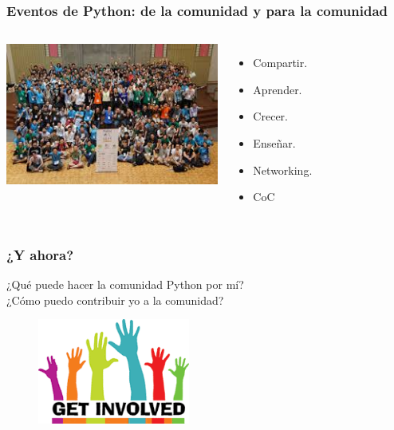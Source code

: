 \documentclass[18pt]{beamer}
\begin{document}
\begin{frame}

	\frametitle{Eventos de Python: de la comunidad y para la comunidad}
	\begin{columns}
		\centering
			\includegraphics[width=7cm]{images/ejemplo_pycon.jpeg}\\
			
		\begin{itemize}
			\setlength\itemsep{0.6em}		
			\item Compartir.
			\item Aprender.
			\item Crecer.
			\item Enseñar.
			\item Networking.
			\item CoC

		\end{itemize}
	\end{columns}
	
	
\end{frame}


\begin{frame}

	\frametitle{¿Y ahora?}
	
	\begin{center}
		\Large ¿Qué puede hacer la comunidad Python por mí?\\
		\vspace{0.5cm}
		\Large ¿Cómo puedo contribuir yo a la comunidad?
	\end{center}
	
	\begin{figure}
		\includegraphics[width=5cm]{images/get_involved.png}
	\end{figure}
	
\end{frame}
\end{document}
